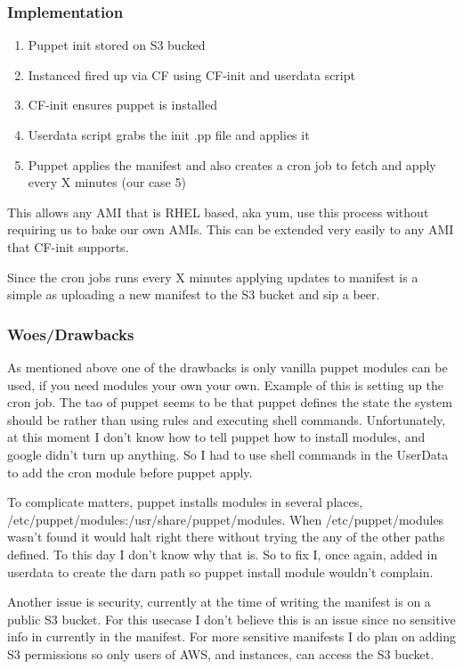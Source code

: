 \documentclass{article}
\begin{document}
\subsubsection{Implementation}

\begin{enumerate}
    \item Puppet init stored on S3 bucked
    \item Instanced fired up via CF using CF-init and userdata script
    \item CF-init ensures puppet is installed
    \item Userdata script grabs the init .pp file and applies it
    \item Puppet applies the manifest and also creates a cron job to fetch and apply every X minutes (our case 5) 
\end{enumerate}

This allows any AMI that is RHEL based, aka yum, use this process without requiring us to bake our own AMIs. This can
be extended very easily to any AMI that CF-init supports.

Since the cron jobs runs every X minutes applying updates to manifest is a simple as uploading a new manifest to the S3 bucket
and sip a beer.

\subsubsection{Woes/Drawbacks}
As mentioned above one of the drawbacks is only vanilla puppet modules can be used, if you need modules your own your own.
Example of this is setting up the cron job. The tao of puppet seems to be that puppet defines the state the system should
be rather than using rules and executing shell commands. Unfortunately, at this moment I don't know how to tell puppet how
to install modules, and google didn't turn up anything. So I had to use shell commands in the UserData to add the cron module
before puppet apply.

To complicate matters, puppet installs modules in several places, /etc/puppet/modules:/usr/share/puppet/modules. When 
/etc/puppet/modules wasn't found it would halt right there without trying the any of the other paths defined. To this day I
don't know why that is. So to fix I, once again, added in userdata to create the darn path so puppet install module wouldn't
complain.

Another issue is security, currently at the time of writing the manifest is on a public S3 bucket. For this usecase I don't
believe this is an issue since no sensitive info in currently in the manifest. For more sensitive manifests I do plan on adding
S3 permissions so only users of AWS, and instances, can access the S3 bucket.
\end{document}
